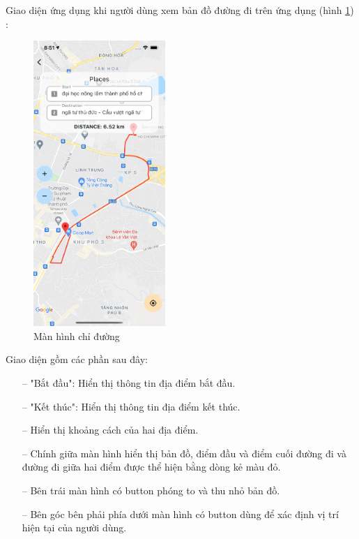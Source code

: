 Giao diện ứng dụng khi người dùng xem bản đồ đường đi trên ứng dụng (hình \ref{fig:screen-map}) :
\begin{figure}[H]
    \centering
    \includegraphics[width=5cm]{images/Screen-Map.png}
    \caption{Màn hình chỉ đường}
    \label{fig:screen-map}
\end{figure}

Giao diện gồm các phần sau đây:
\begin{itemize}
    \item[--] "Bắt đầu": Hiển thị thông tin địa điểm bắt đầu.
    \item[--] "Kết thúc": Hiển thị thông tin địa điểm kết thúc.
    \item[--] Hiển thị khoảng cách của hai địa điểm.
    \item[--] Chính giữa màn hình hiển thị bản đồ, điểm đầu và điểm cuối đường đi và đường đi giữa hai điểm được thể hiện bằng dòng kẻ màu đỏ.
    \item[--] Bên trái màn hình có button phóng to và thu nhỏ bản đồ.
    \item[--] Bên góc bên phải phía dưới màn hình có button dùng để xác định vị trí hiện tại của người dùng.
\end{itemize}
